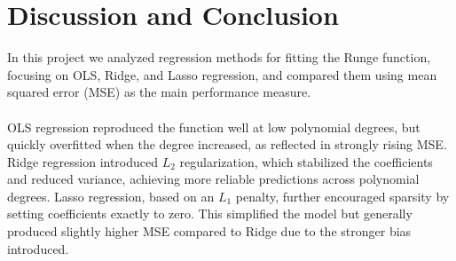 \documentclass[
    article
 reprint,            %
 amsmath,amssymb,
 aps,
]{revtex4-2}
\begin{document}
% 

% 

% 


\section{Discussion and Conclusion}
\label{sec:Discussion_and_Conclusion}
In this project we analyzed regression methods for fitting the Runge function, focusing on OLS, Ridge, and Lasso regression, and compared them using mean squared error (MSE) as the main performance measure.\\\\

OLS regression reproduced the function well at low polynomial degrees, but quickly overfitted when the degree increased, as reflected in strongly rising MSE.
Ridge regression introduced $L_2$ regularization, which stabilized the coefficients and reduced variance, achieving more reliable predictions across polynomial degrees.
Lasso regression, based on an $L_1$ penalty, further encouraged sparsity by setting coefficients exactly to zero.
This simplified the model but generally produced slightly higher MSE compared to Ridge due to the stronger bias introduced.\\\\
\end{document}
